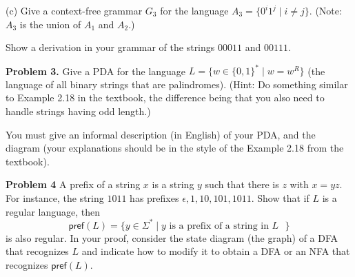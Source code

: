 \documentclass[11pt]{article}
\begin{document}
(c)   Give a context-free grammar $G_3$ for the language $A_3 = \{0^i 1^j \mid i \not=  j\}$. (Note: $A_3$ is the union of $A_1$ and $A_2$.)

Show a derivation in your grammar of the strings $00011$ and $00111$.
\bigskip

\textbf{Problem 3.}   Give a PDA for the language $L = \{w \in \{0,1\}^* \mid w = w^R\}$ (the language of all binary strings that are palindromes). (Hint: Do something similar to Example 2.18 in the textbook, the difference being that you also need to handle strings having odd length.)

You must give an informal description (in English) of your PDA, and the diagram (your explanations should be in the style of the Example 2.18 from the textbook).

\bigskip
\textbf{Problem 4}  A prefix of a string $x$ is a string $y$ such that there is $z$ with $x=yz$. For instance, the string $1011$ has prefixes $\epsilon, 1, 10, 101, 1011$.  Show that if $L$ is a regular language, then
\[
  \mathsf{pref}(L) = \{y \in \Sigma^* \mid y \textrm{ is a prefix of a string in $L$ } \}
\]
is also regular. In your proof, consider the state diagram (the graph) of a DFA that recognizes $L$ and indicate how to modify it to obtain a DFA or an NFA that recognizes  $\mathsf{pref}(L).$
\end{document}
